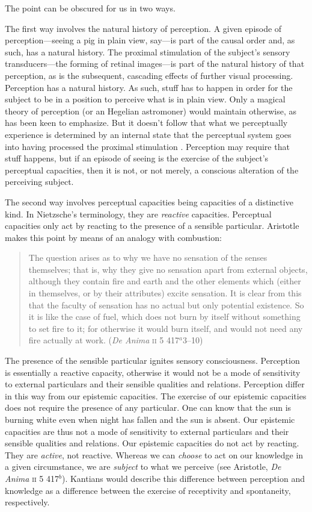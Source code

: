 \documentclass[12pt]{article}
\begin{document}
The point can be obscured for us in two ways.

The first way involves the natural history of perception. A given episode of perception---seeing a pig in plain view, say---is part of the causal order and, as such, has a natural history. The proximal stimulation of the subject's sensory transducers---the forming of retinal images---is part of the natural history of that perception, as is the subsequent, cascading effects of further visual processing. Perception has a natural history. As such, stuff has to happen in order for the subject to be in a position to perceive what is in plain view. Only a magical theory of perception (or an Hegelian astromoner) would maintain otherwise, as \citet{Burge:2005uq} has been keen to emphasize. But it doesn't follow that what we perceptually experience is determined by an internal state that the perceptual system goes into having processed the proximal stimulation \citep[see][]{Campbell:2010uq,McDowell:2010fk,Travis:2011os}. Perception may require that stuff happens, but if an episode of seeing is the exercise of the subject's perceptual capacities, then it is not, or not merely, a conscious alteration of the perceiving subject.

The second way involves perceptual capacities being capacities of a distinctive kind. In Nietzsche's \citeyearpar{Nietzsche1887On-the-Genealog} terminology, they are \emph{reactive} capacities. Perceptual capacities only act by reacting to the presence of a sensible particular. Aristotle makes this point by means of an analogy with combustion:
\begin{quote}
	The question arises as to why we have no sensation of the senses themselves; that is, why they give no sensation apart from external objects, although they contain fire and earth and the other elements which (either in themselves, or by their attributes) excite sensation. It is clear from this that the faculty of sensation has no actual but only potential existence. So it is like the case of fuel, which does not burn by itself without something to set fire to it; for otherwise it would burn itself, and would not need any fire actually at work. (\emph{De Anima} \textsc{ii} 5 417\( ^{a} \)3--10)
\end{quote}
The presence of the sensible particular ignites sensory consciousness. Perception is essentially a reactive capacity, otherwise it would not be a mode of sensitivity to external particulars and their sensible qualities and relations. Perception differ in this way from our epistemic capacities. The exercise of our epistemic capacities does not require the presence of any particular. One can know that the sun is burning white even when night has fallen and the sun is absent. Our epistemic capacities are thus not a mode of sensitivity to external particulars and their sensible qualities and relations. Our epistemic capacities do not act by reacting. They are \emph{active}, not reactive. Whereas we can \emph{choose} to act on our knowledge in a given circumstance, we are \emph{subject} to what we perceive (see Aristotle, \emph{De Anima} \textsc{ii} 5 417\( ^{b} \)). Kantians would describe this difference between perception and knowledge as a difference between the exercise of receptivity and spontaneity, respectively. 
\end{document}
